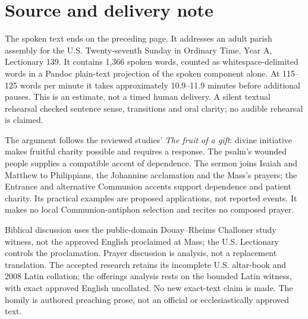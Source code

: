 \section{Source and delivery note}
The spoken text ends on the preceding page. It addresses an adult parish assembly for the U.S. Twenty-seventh Sunday in Ordinary Time, Year A, Lectionary 139. It contains 1,366 spoken words, counted as whitespace-delimited words in a Pandoc plain-text projection of the spoken component alone. At 115--125 words per minute it takes approximately 10.9--11.9 minutes before additional pauses. This is an estimate, not a timed human delivery. A silent textual rehearsal checked sentence sense, transitions and oral clarity; no audible rehearsal is claimed.

The argument follows the reviewed studies' \emph{The fruit of a gift}: divine initiative makes fruitful charity possible and requires a response. The psalm's wounded people supplies a compatible accent of dependence. The sermon joins Isaiah and Matthew to Philippians, the Johannine acclamation and the Mass's prayers; the Entrance and alternative Communion accents support dependence and patient charity. Its practical examples are proposed applications, not reported events. It makes no local Communion-antiphon selection and recites no composed prayer.

Biblical discussion uses the public-domain Douay--Rheims Challoner study witness, not the approved English proclaimed at Mass; the U.S. Lectionary controls the proclamation. Prayer discussion is analysis, not a replacement translation. The accepted research retains its incomplete U.S. altar-book and 2008 Latin collation; the offerings analysis rests on the bounded Latin witness, with exact approved English uncollated. No new exact-text claim is made. The homily is authored preaching prose, not an official or ecclesiastically approved text.

